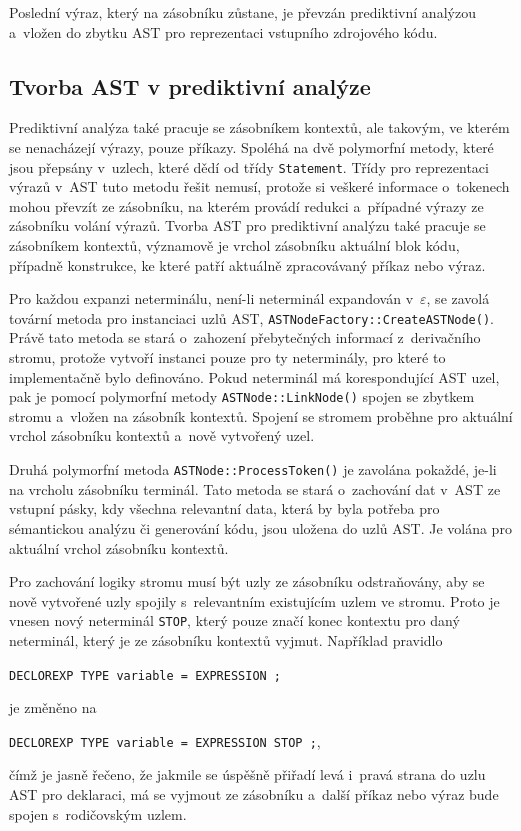 Poslední výraz, který na zásobníku zůstane, je převzán prediktivní analýzou a~vložen do zbytku AST pro reprezentaci vstupního zdrojového kódu.

\subsection*{Tvorba AST v prediktivní analýze}
Prediktivní analýza také pracuje se zásobníkem kontextů, ale takovým, ve kterém se nenacházejí výrazy, pouze příkazy.
Spoléhá na dvě polymorfní metody, které jsou přepsány v~uzlech, které dědí od třídy \texttt{Statement}.
Třídy pro reprezentaci výrazů v~AST tuto metodu řešit nemusí, protože si veškeré informace o~tokenech mohou převzít ze zásobníku, na kterém provádí redukci a~případné výrazy ze zásobníku volání výrazů.
Tvorba AST pro prediktivní analýzu také pracuje se zásobníkem kontextů, významově je vrchol zásobníku aktuální blok kódu, případně konstrukce, ke které patří aktuálně zpracovávaný příkaz nebo výraz.

Pro každou expanzi neterminálu, není-li neterminál expandován v~$\varepsilon$, se zavolá tovární metoda pro instanciaci uzlů AST, \texttt{ASTNodeFactory::CreateASTNode()}.
Právě tato metoda se stará o~zahození přebytečných informací z~derivačního stromu, protože vytvoří instanci pouze pro ty neterminály, pro které to implementačně bylo definováno.
Pokud neterminál má korespondující AST uzel, pak je pomocí polymorfní metody \texttt{ASTNode::LinkNode()} spojen se zbytkem stromu a~vložen na zásobník kontextů.
Spojení se stromem proběhne pro aktuální vrchol zásobníku kontextů a~nově vytvořený uzel.

Druhá polymorfní metoda \texttt{ASTNode::ProcessToken()} je zavolána pokaždé, je-li na vrcholu zásobníku terminál.
Tato metoda se stará o~zachování dat v~AST ze vstupní pásky, kdy všechna relevantní data, která by byla potřeba pro sémantickou analýzu či generování kódu, jsou uložena do uzlů AST.
Je volána pro aktuální vrchol zásobníku kontextů.

Pro zachování logiky stromu musí být uzly ze zásobníku odstraňovány, aby se nově vytvořené uzly spojily s~relevantním existujícím uzlem ve stromu.
Proto je vnesen nový neterminál \texttt{STOP}, který pouze značí konec kontextu pro daný neterminál, který je ze zásobníku kontextů vyjmut.
Například pravidlo
\begin{center}
    \texttt{DECLOREXP \textrightarrow{} TYPE variable = EXPRESSION ;}
\end{center}
je změněno na 
\begin{center}
    \texttt{DECLOREXP \textrightarrow{} TYPE variable = EXPRESSION STOP ;},
\end{center}
čímž je jasně řečeno, že jakmile se úspěšně přiřadí levá i~pravá strana do uzlu AST pro deklaraci, má se vyjmout ze zásobníku a~další příkaz nebo výraz bude spojen s~rodičovským uzlem.

